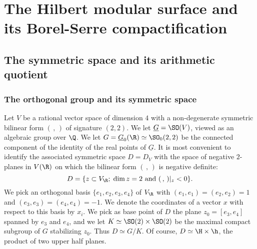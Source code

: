 \section{The Hilbert modular surface and  its Borel-Serre compactification}


\subsection{The symmetric space and its arithmetic quotient}

\subsubsection{The orthogonal group and its symmetric space}


Let $V$ be a rational vector space of dimension $4$ with a
non-degenerate symmetric bilinear form  $(\,,\,)$ of signature
$(2,2)$.
We let $\underline{G} = \SO(V)$, viewed as an algebraic group over $\Q$.
We let $G=\underline{G}_0(\R) \simeq \SO_0(2,2)$ be the connected
component of the identity of the real points of $\underline{G}$.
It is most convenient to identify the associated symmetric space $D= D_V$ with the
space of negative $2$-planes in $V(\R)$ on which the bilinear form $(\,,\,)$ is
negative definite:
\[
D = \{z \subset V_{\R} ; \;\text{$\dim z =2$ and $(\,,\,)|_z < 0$}
\}.
\]
We pick an orthogonal basis $\{e_1,e_2,e_3,e_4\}$ of $V_{\R}$ with
$(e_1,e_1)=(e_2,e_2)=1$ and $(e_3,e_3)=(e_4,e_4)=-1$. We denote the
coordinates of a vector $x$ with respect to this basis by $x_i$.
We pick as base point of $D$ the plane $z_0=[e_3,e_4]$ spanned by
$e_3$ and $e_4$, and we let $K \simeq \SO(2)\times \SO(2)$ be the
maximal compact subgroup of $G$ stabilizing $z_0$. Thus $D \simeq
G/K$. Of course, $D \simeq \H \times \h$, the product of two upper
half planes.


